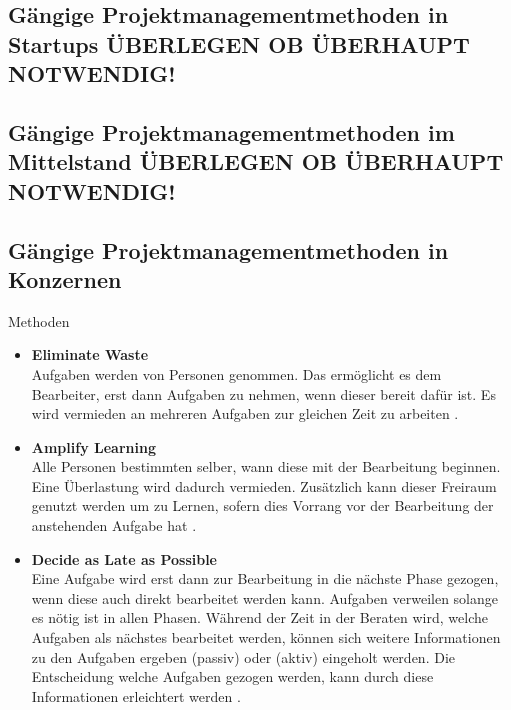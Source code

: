 

\subsection{G\"angige Projektmanagementmethoden in Startups ÜBERLEGEN OB ÜBERHAUPT NOTWENDIG!} 

\subsection{G\"angige Projektmanagementmethoden im Mittelstand ÜBERLEGEN OB ÜBERHAUPT NOTWENDIG!} \label{Kap:MethodenMittelstand}

\subsection{G\"angige Projektmanagementmethoden in Konzernen} \label{Kap:MethodenKonzerne}
Methoden


	\begin{itemize}
	\item \textbf{Eliminate Waste}\\
	Aufgaben werden von Personen genommen. Das ermöglicht es dem Bearbeiter, erst dann Aufgaben zu nehmen, wenn dieser bereit dafür ist. Es wird vermieden an mehreren Aufgaben zur gleichen Zeit zu arbeiten \autocite[vgl.][S.55]{kanban}. 
	
	\item \textbf{Amplify Learning}\\
	Alle Personen bestimmten selber, wann diese mit der Bearbeitung beginnen. Eine Überlastung wird dadurch vermieden. Zusätzlich kann dieser Freiraum genutzt werden um zu Lernen, sofern dies Vorrang vor der Bearbeitung der anstehenden Aufgabe hat \autocite[vgl.][S.55]{kanban}. 
	
	\item \textbf{Decide as Late as Possible}\\
	Eine Aufgabe wird erst dann zur Bearbeitung in die nächste Phase gezogen, wenn diese auch direkt bearbeitet werden kann. Aufgaben verweilen solange es nötig ist in allen Phasen. Während der Zeit in der Beraten wird, welche Aufgaben als nächstes bearbeitet werden, können sich weitere Informationen zu den Aufgaben ergeben (passiv) oder (aktiv) eingeholt werden. Die Entscheidung welche Aufgaben gezogen werden, kann durch diese Informationen erleichtert werden \autocite[vgl.][S.55,56]{kanban}.
\end{itemize}  